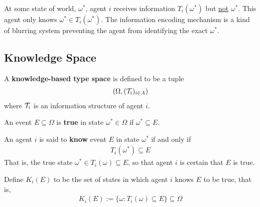 \documentclass{article}
\begin{document}
    \begin{remark}[Interpretation]
    	At some state of world, $\omega^*$, agent $i$ receives information $T_i(\omega^*)$ but \ul{not} $\omega^*$. This agent only knows $\omega^* \in T_i(\omega^*)$. The information encoding mechanism is a kind of blurring system preventing the agent from identifying the exact $\omega^*$.
    \end{remark}
    
    \subsection{Knowledge Space}
    \begin{definition}
    	A \textbf{knowledge-based type space} is defined to be a tuple
    	\begin{align}
    		(\Omega, (\mathcal{{T}}_i)_{i \in A})
    	\end{align}
    	where $\mathcal{{T}}_i$ is an information structure of agent $i$.
    \end{definition}
    
    \begin{definition}
    	An event $E \subseteq \Omega$ is \textbf{true} in state $\omega^* \in \Omega$ if $\omega^* \subseteq E$. 
    \end{definition}
   
   	\begin{definition}
   		An agent $i$ is said to \textbf{know} event $E$ in state $\omega^*$ if and only if
   		\begin{align}
   			T_i(\omega^*) \subseteq E
   		\end{align}
   		That is, the true state $\omega^* \in T_i(\omega) \subseteq E$, so that agent $i$ is certain that $E$ is true.
   	\end{definition}
   	
   	\begin{definition}
   		Define $K_i(E)$ to be the set of states in which agent $i$ knows $E$ to be true, that is,
   		\begin{align}
   			K_i(E) := \{\omega: T_i(\omega) \subseteq E\} \subseteq \Omega
   		\end{align}
   	\end{definition}
   	
\end{document}
